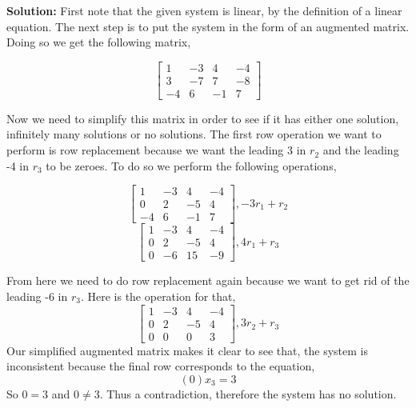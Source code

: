 \documentclass{amsart}
\begin{document}
\noindent \textbf{Solution: }
First note that the given system is linear, by the definition of a linear equation. The next step is to put the system in the form of an augmented matrix. Doing so we get the following matrix,

\begin{equation}
\begin{bmatrix} 
1&-3&4&-4\\
3&-7&7&-8\\
-4&6&-1&7
\end{bmatrix}
\end{equation}

Now we need to simplify this matrix in order to see if it has either one solution, infinitely many solutions or no solutions. The first row operation we want to perform is row replacement because we want the leading 3 in $r_2$ and the leading -4 in $r_3$ to be zeroes. To do so we perform the following operations,

\begin{equation}
\begin{bmatrix} 
1&-3&4&-4\\
0&2&-5&4\\
-4&6&-1&7
\end{bmatrix},   -3r_1+r_2
\end{equation}
\begin{equation}
\begin{bmatrix} 
1&-3&4&-4\\
0&2&-5&4\\
0&-6&15&-9
\end{bmatrix},   4r_1+r_3
\end{equation}

From here we need to do row replacement again because we want to get rid of the leading -6 in $r_3$. Here is the operation for that,
\begin{equation}
\begin{bmatrix} 
1&-3&4&-4\\
0&2&-5&4\\
0&0&0&3
\end{bmatrix},   3r_2+r_3
\end{equation}
Our simplified augmented matrix makes it clear to see that, the system is inconsistent because the final row corresponds to the equation,
\begin{equation}
(0)x_3=3
\end{equation}
So $0=3$ and $0\neq 3$. Thus a contradiction, therefore the system has no solution.
\end{document}
